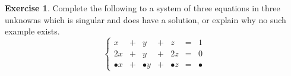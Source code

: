 \documentclass[11pt]{amsart}
\theoremstyle{definition}
\newtheorem{exercise}{Exercise}
\begin{document}
\begin{exercise}
Complete the following to a system of three equations in three unknowns which is singular and does have a solution, or explain why no such example exists.
\[
\left\{
\begin{array}{ccccccc}
 x & + & y & + & z & = & 1 \\
2x & + & y & + & 2z & = & 0 \\
\bullet x & + & \bullet y & + &\bullet z &  = & \bullet
\end{array}
\right.
\]

\end{exercise}
\end{document}
